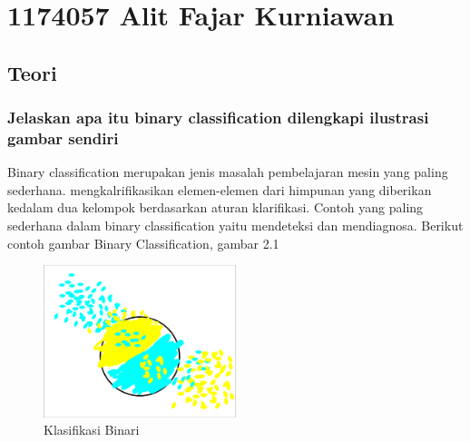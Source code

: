 \section{1174057 Alit Fajar Kurniawan}
\subsection{Teori}
	\subsubsection{Jelaskan apa itu binary classiﬁcation dilengkapi ilustrasi gambar sendiri}
	\par Binary classiﬁcation merupakan jenis masalah pembelajaran mesin yang paling sederhana.
	mengkalriﬁkasikan elemen-elemen dari himpunan yang diberikan kedalam dua kelompok berdasarkan aturan klariﬁkasi. Contoh yang paling sederhana dalam binary classification yaitu mendeteksi dan mendiagnosa. Berikut contoh gambar Binary Classification, gambar 2.1
		\begin{figure}[H]
			\centering
			\includegraphics[width=0.5\textwidth]{figures/1174057/chapter2/1.jpg}
			\caption{Klasifikasi Binari}
			\label{print}
		\end{figure}

